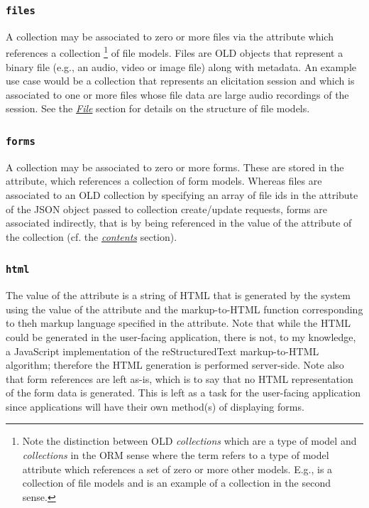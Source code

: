 \documentclass[letterpaper,10pt,english]{sphinxmanual}
\begin{document}
\subsubsection{\texttt{files}}
\label{datastructure:files}
A collection may be associated to zero or more files via the  attribute
which references a collection \footnote{
Note the distinction between OLD \emph{collections} which are a type of
model and \emph{collections} in the ORM sense where the term refers to a type of
model attribute which references a set of zero or more other models.  E.g.,
 is a collection of file models and is an example of a
collection in the second sense.
} of file models.  Files are OLD objects that
represent a binary file (e.g., an audio, video or image file) along with
metadata.  An example use case would be a collection that represents an
elicitation session and which is associated to one or more files whose file data
are large audio recordings of the session.  See the {\hyperref[datastructure:file-data-structure]{\emph{File}}}
section for details on the structure of file models.


\subsubsection{\texttt{forms}}
\label{datastructure:forms}
A collection may be associated to zero or more forms.  These are stored in the
 attribute, which references a collection of form models.  Whereas
files are associated to an OLD collection by specifying an array of file ids
in the  attribute of the JSON object passed to collection create/update
requests, forms are associated indirectly, that is by being referenced in the
value of the  attribute of the collection (cf. the
{\hyperref[datastructure:collection-contents]{\emph{contents}}} section).


\subsubsection{\texttt{html}}
\label{datastructure:html}
The value of the  attribute is a string of HTML that is generated by the
system using the value of the  attribute and the
markup-to-HTML function corresponding to theh markup language specified in the
 attribute.  Note that while the HTML could be generated in
the user-facing application, there is not, to my knowledge, a JavaScript
implementation of the reStructuredText markup-to-HTML algorithm; therefore the
HTML generation is performed server-side.  Note also that form references are
left as-is, which is to say that no HTML representation of the form data is
generated.  This is left as a task for the user-facing application since
applications will have their own method(s) of displaying forms.
\end{document}
